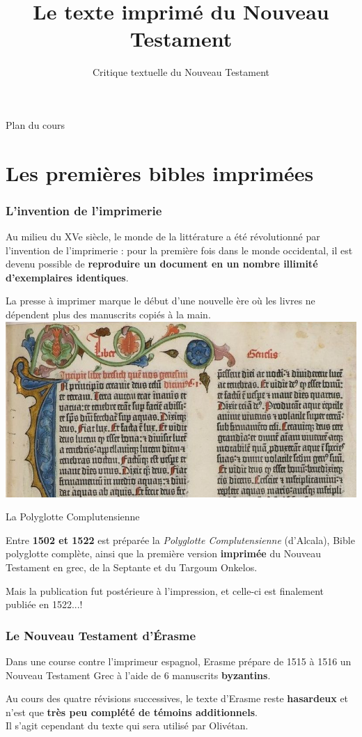 \documentclass[11pt]{beamer}
\begin{document}
\title{Le texte imprimé du Nouveau Testament}
\subtitle{Critique textuelle du Nouveau Testament}

\begin{frame}{}
    \titlepage
\end{frame}

\begin{frame}{Plan du cours}
\tableofcontents
\end{frame}

\section{Les premières bibles imprimées}

\begin{frame}
  \frametitle{L'invention de l'imprimerie}
  \begin{alertblock}{}
      Au milieu du XVe siècle, le monde de la littérature a été révolutionné par l'invention de l'imprimerie : pour la première fois dans le monde occidental, il est devenu possible de \textbf{reproduire un document en un nombre illimité d'exemplaires identiques}.
  \end{alertblock}
  La presse à imprimer marque le début d'une nouvelle ère où les livres ne dépendent plus des manuscrits copiés à la main.
\centering
\includegraphics[width=0.5\linewidth]{img/incipit_genese_image_en_une.jpg}
\end{frame}



\begin{frame}{La Polyglotte Complutensienne}
    \begin{alertblock}{}
        Entre \textbf{1502 et 1522} est préparée la \textit{Polyglotte Complutensienne} (d'Alcala), 
        Bible polyglotte complète, ainsi que la première version \textbf{imprimée} du Nouveau Testament en grec, de la Septante et du Targoum Onkelos.
    \end{alertblock}
    Mais la publication fut postérieure à l'impression, et celle-ci est finalement publiée en 1522...!
\end{frame}


\begin{frame}
  \frametitle{Le Nouveau Testament d'Érasme}
  \begin{alertblock}{}
      Dans une course contre l'imprimeur espagnol, Erasme prépare de 1515 à 1516 un Nouveau Testament Grec à l'aide de 6 manuscrits \textbf{byzantins}.
  \end{alertblock}

  Au cours des quatre révisions successives, le texte d'Erasme reste \textbf{hasardeux} et n'est que \textbf{très peu complété de témoins additionnels}.\\

  Il s'agit cependant du texte qui sera utilisé par Olivétan.
\end{frame}
\end{document}

